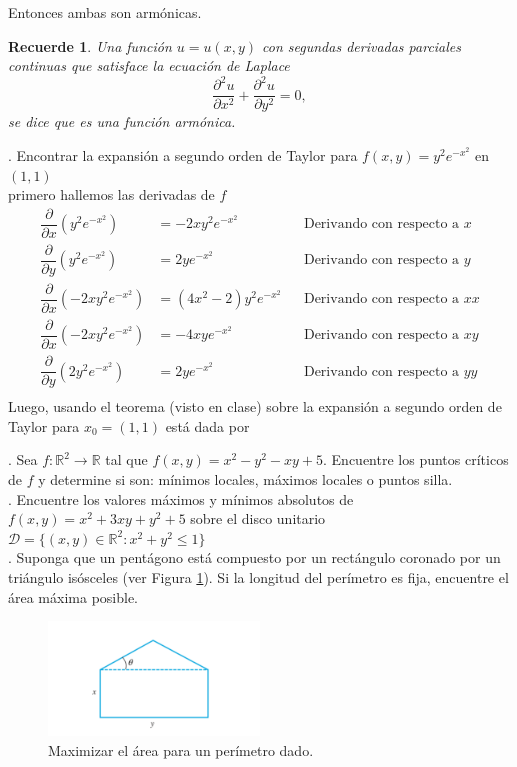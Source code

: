 \documentclass[letterpaper]{article}
\renewcommand{\d}{\partial}
\newtheorem*{remark}{Recuerde}
\renewcommand{\*}{\cdot}
\theoremstyle{definition}
\begin{document}
Entonces ambas son armónicas.

\begin{remark}
Una función $u = u(x,y)$ con segundas derivadas parciales continuas que satisface la ecuación de Laplace  $$ \dfrac{\partial^2 u}{\partial x^2} + \dfrac{\partial^2 u}{\partial y^2}= 0,$$ se dice que es una función armónica.
\end{remark}

. Encontrar la expansión a segundo orden de Taylor para $f(x,y) = y^2e^{-x^2}$ en $(1,1)$\\

primero hallemos las derivadas de $ f $
\begin{align*}
	\dfrac{\d}{\d x} (y^2 e^{-x^2}) &= -2xy^2e^{-x^2} &&\text{Derivando con respecto a }x\\
	\dfrac{\d}{\d y} (y^2 e^{-x^2}) &= 2ye^{-x^2} &&\text{Derivando con respecto a }y\\
	\dfrac{\d}{\d x} (-2xy^2e^{-x^2}) &= (4x^2 - 2)y^2e^{-x^2} &&\text{Derivando con respecto a }xx\\
	\dfrac{\d}{\d x} (-2xy^2e^{-x^2}) &= -4xye^{-x^2} &&\text{Derivando con respecto a }xy\\
	\dfrac{\d}{\d y} (2y^2e^{-x^2}) &= 2ye^{-x^2} &&\text{Derivando con respecto a }yy\\
\end{align*}
Luego, usando el teorema (visto en clase) sobre la expansión a segundo orden de Taylor para $ x_0 =(1,1) $ está dada por


. Sea $f: \mathbb{R}^2 \longrightarrow \mathbb{R}$ tal que  $f(x,y) = x^2 - y^2 - xy + 5$. Encuentre los puntos críticos de $f$ y determine si son: mínimos locales, máximos locales o puntos silla.\\

. Encuentre los valores máximos y mínimos absolutos de $f(x,y) = x^2 + 3xy + y^2 + 5$ sobre el disco unitario $\mathcal{D} = \{(x,y) \in \mathbb{R}^2 : x^2 + y^2 \leq 1 \}$\\

. Suponga que un pentágono está compuesto por un rectángulo coronado por un triángulo isósceles (ver Figura \ref{fig:1}). Si la longitud del perímetro es fija, encuentre el área máxima posible.

\begin{figure}[h]
    \centering
    \includegraphics[width=0.5\textwidth]{img/figT}
    \caption{Maximizar el área para un perímetro dado.}
    \label{fig:1}
\end{figure}
\end{document}
